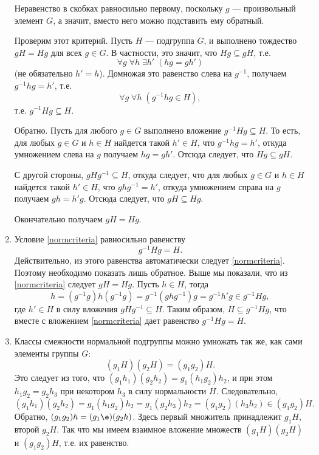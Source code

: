 \begin{enumerate}
Неравенство в скобках равносильно первому, поскольку $g$ --- произвольный элемент $G$, а значит, вместо него можно подставить ему обратный.

Проверим этот критерий. Пусть $H$ --- подгруппа $G$, и выполнено тождество $gH=Hg$ для всех $g\in G$. В частности, это значит, что $Hg\subseteq gH$, т.е.
$$
\forall g\;\forall h\;\exists h'\;(hg=gh')
$$
(не обязательно $h'=h$). Домножая это равенство слева на $g^{-1}$, получаем $g^{-1}hg=h'$, т.е.
$$
\forall g\;\forall h\;(g^{-1}hg\in H),
$$
т.е. $g^{-1}Hg\subseteq H$.

Обратно. Пусть для любого $g\in G$ выполнено вложение $g^{-1}Hg\subseteq H$. То есть, для любых $g\in G$ и $h\in H$ найдется такой $h'\in H$, что $g^{-1}hg=h'$, откуда умножением слева на $g$ получаем $hg=gh'$. Отсюда следует, что $Hg\subseteq gH$.

С другой стороны, $gHg^{-1}\subseteq H$, откуда следует, что для любых $g\in G$ и $h\in H$ найдется такой $h'\in H$, что $ghg^{-1}=h'$, откуда умножением справа на $g$ получаем $gh=h'g$. Отсюда следует, что $gH\subseteq Hg$. 

Окончательно получаем $gH=Hg$.

\item Условие \eqref{normcriteria} равносильно равенству
$$
g^{-1}Hg=H.
$$
Действительно, из этого равенства автоматически следует \eqref{normcriteria}. Поэтому необходимо показать лишь обратное. Выше мы показали, что из \eqref{normcriteria} следует $gH=Hg$. Пусть $h\in H$, тогда
$$
h=(g^{-1}g)h(g^{-1}g)=g^{-1}(ghg^{-1})g=g^{-1}h'g\in g^{-1}Hg,
$$
где $h'\in H$ в силу вложения $gHg^{-1}\subseteq H$. Таким образом, $H\subseteq g^{-1}Hg$, что вместе с вложением \eqref{normcriteria} дает равенство $g^{-1}Hg=H$.


\item Классы смежности нормальной подгруппы можно умножать так же, как сами элементы группы $G$:
\begin{equation}\label{classprod}
(g_1H)(g_2H)=(g_1g_2)H.
\end{equation}
Это следует из того, что $(g_1h_1)(g_2h_2)=g_1(h_1g_2)h_2$, и при этом $h_1g_2=g_2h_3$ при некотором $h_3$ в силу нормальности $H$. Следовательно,
$$
(g_1h_1)(g_2h_2) = g_1(h_1g_2)h_2 = g_1(g_2h_3)h_2=(g_1g_2)(h_3h_2)\in (g_1g_2)H.
$$
Обратно, $(g_1g_2)h=(g_1\e)(g_2h)$. Здесь первый множитель принадлежит $g_1H$, второй $g_2H$. Так что мы имеем взаимное вложение множеств $(g_1H)(g_2H)$ и $(g_1g_2)H$, т.е. их равенство.


\end{enumerate}
